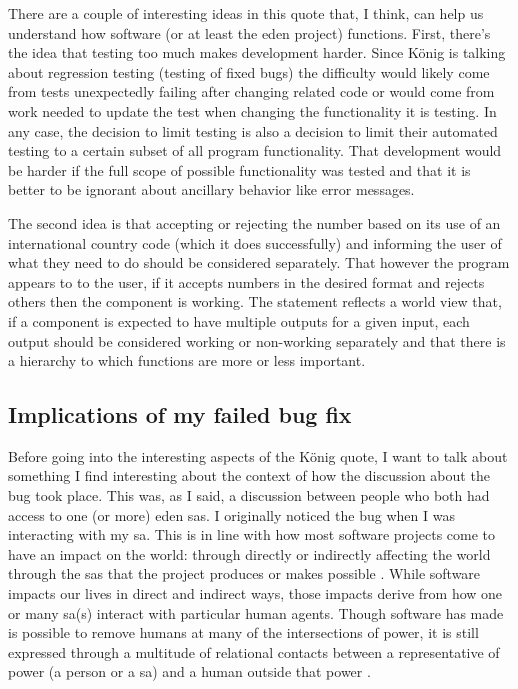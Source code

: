 \documentclass[a4paper,man,natbib,floatsintext]{apa6}
\begin{document}
   There are a couple of interesting ideas in this quote that, I think, can help us understand how software (or at least the \acrshort{eden} project) functions. First, there's the idea that testing too much makes development harder. Since K{\"o}nig is talking about regression testing (testing of fixed bugs) the difficulty would likely come from tests unexpectedly failing after changing related code or would come from work needed to update the test when changing the functionality it is testing. In any case, the decision to limit testing is also a decision to limit their automated testing to a certain subset of all program functionality. That development would be harder if the full scope of possible functionality was tested and that it is better to be ignorant about ancillary behavior like error messages.

   The second idea is that accepting or rejecting the number based on its use of an international country code (which it does successfully) and informing the user of what they need to do should be considered separately. That however the program appears to to the user, if it accepts numbers in the desired format and rejects others then the component is working. The statement reflects a world view that, if a component is expected to have multiple outputs for a given input, each output should be considered working or non-working separately and that there is a hierarchy to which functions are more or less important. 

   \subsection{Implications of my failed bug fix}
   Before going into the interesting aspects of the K{\"o}nig quote, I want to talk about something I find interesting about the context of how the discussion about the bug took place. This was, as I said, a discussion between people who both had access to one (or more) \acrshort{eden} \glspl{sa}. I originally noticed the bug when I was interacting with my \gls{sa}. This is in line with how most software projects come to have an impact on the world: through directly or indirectly affecting the world through the \glspl{sa} that the project produces or makes possible \citep{Kitchin2011-af}. While software impacts our lives in direct and indirect ways, those impacts derive from how one or many \gls{sa}(s) interact with particular human agents. Though software has made is possible to remove humans at many of the intersections of power, it is still expressed through a multitude of relational contacts between a representative of power (a person or a \gls{sa}) and a human outside that power \citet{Cheney-Lippold2018-lw,Deluze1995-eo}. 
\end{document}

